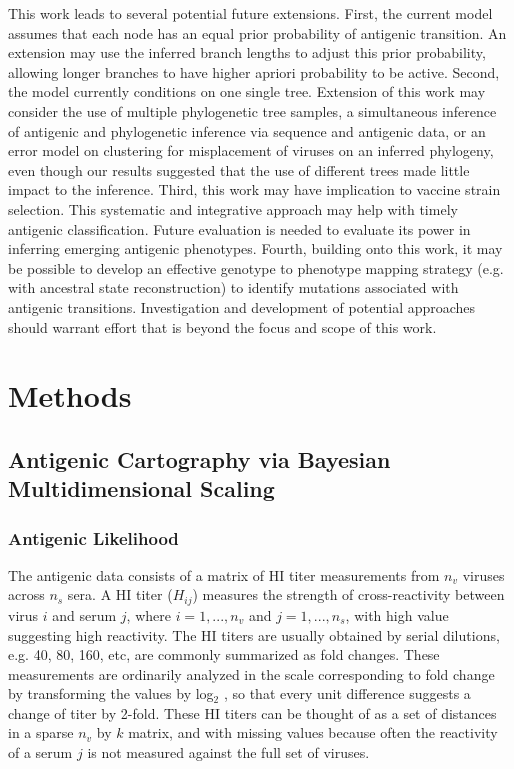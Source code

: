 \documentclass[11pt,oneside,letterpaper]{article}
\begin{document}
This work leads to several potential future extensions. 
First, the current model assumes that each node has an equal prior probability of antigenic transition. 
An extension may use the inferred branch lengths to adjust this prior probability, allowing longer branches to have higher apriori probability to be active.
Second, the model currently conditions on one single tree. 
Extension of this work may consider the use of multiple phylogenetic tree samples, a simultaneous inference of antigenic and phylogenetic inference via sequence and antigenic data, or  an error model on clustering for misplacement of viruses on an inferred phylogeny, even though our results suggested that the use of different trees made little impact to the inference. 
Third, this work may have implication to vaccine strain selection. 
This systematic and integrative approach may help with timely antigenic classification. 
Future evaluation is needed to evaluate its power in inferring emerging antigenic phenotypes. 
Fourth, building onto this work, it may be possible to develop an effective genotype to phenotype mapping strategy (e.g. with ancestral state reconstruction) to identify mutations associated with antigenic transitions. 
Investigation and development of potential approaches should warrant effort that is beyond the focus and scope of this work.






\newpage




\section*{Methods}


\subsection*{Antigenic Cartography via Bayesian Multidimensional Scaling}



\subsubsection*{Antigenic Likelihood }


The antigenic data consists of a matrix of HI titer measurements from $n_v$ viruses across $n_s$ sera.  
A HI titer ($H_{ij}$) measures the strength of cross-reactivity between virus $i$ and serum $j$, where $i=1, ...,  n_v$ and $j=1,...,n_s$, with high value suggesting high reactivity. 
The HI titers are usually obtained by serial dilutions, e.g. 40, 80, 160, etc, are commonly summarized as fold changes. These measurements are ordinarily analyzed in the scale corresponding to fold change by transforming the values by log$_2$ \cite{smith_mapping_2004, bedford_integrating_2014}, so that every unit difference suggests a change of titer by 2-fold. 
These HI titers can be thought of as a set of distances in a sparse $n_v$ by $k$ matrix, and with missing values because often the reactivity of a serum $j$ is not measured against the full set of viruses.
	
\end{document}
